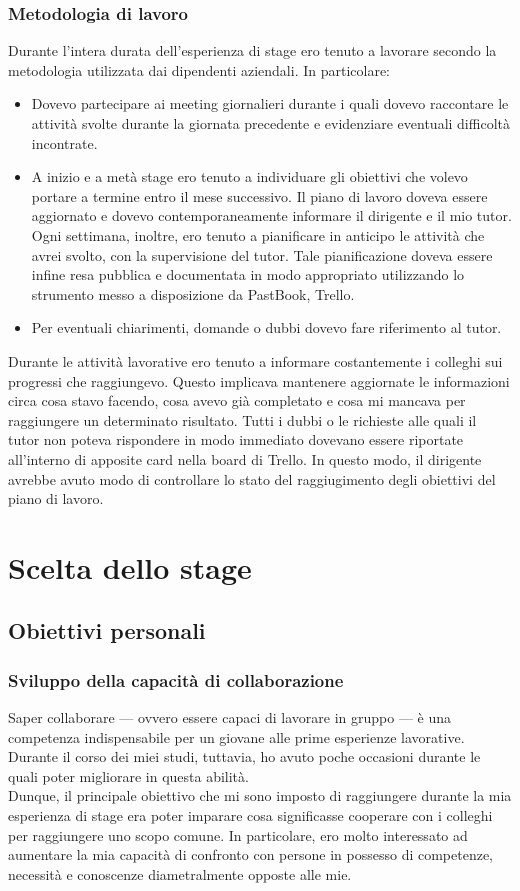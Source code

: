 		\subsubsection{Metodologia di lavoro}
			Durante l'intera durata dell'esperienza di stage ero tenuto a lavorare secondo la metodologia utilizzata dai dipendenti
			aziendali. In particolare:
			\begin{itemize}
				\item Dovevo partecipare ai meeting giornalieri durante i quali dovevo raccontare le attività svolte durante la
				giornata precedente e evidenziare eventuali difficoltà incontrate.
				\item A inizio e a metà stage ero tenuto a individuare gli obiettivi che volevo portare a termine entro il
				mese successivo. Il piano di lavoro doveva essere aggiornato e dovevo contemporaneamente informare il dirigente e il
				mio tutor. Ogni settimana, inoltre, ero tenuto a pianificare in anticipo le attività che avrei svolto, con la
				supervisione del tutor. Tale pianificazione doveva essere infine resa pubblica e documentata in modo appropriato
				utilizzando lo strumento messo a disposizione da PastBook, Trello.
				\item Per eventuali chiarimenti, domande o dubbi dovevo fare riferimento al tutor.
			\end{itemize}
			Durante le attività lavorative ero tenuto a informare costantemente i colleghi sui progressi che raggiungevo. Questo
			implicava mantenere aggiornate le informazioni circa cosa stavo facendo, cosa avevo già completato e cosa mi mancava
			per raggiungere un determinato risultato. Tutti i dubbi o le richieste alle quali il tutor non poteva rispondere in modo
			immediato dovevano essere riportate all'interno di apposite card nella board di Trello. In questo modo, il dirigente avrebbe
			avuto modo di controllare lo stato del raggiugimento degli obiettivi del piano di lavoro.
	\section{Scelta dello stage}
		\subsection{Obiettivi personali}
			\subsubsection{Sviluppo della capacità di collaborazione}
				Saper collaborare — ovvero essere capaci di lavorare in gruppo — è una competenza indispensabile per un giovane alle
				prime esperienze lavorative. Durante il corso dei miei studi, tuttavia, ho avuto poche occasioni durante le quali
				poter migliorare in questa abilità.\\
				Dunque, il principale obiettivo che mi sono imposto di raggiungere durante la mia esperienza di stage era
				poter imparare cosa significasse cooperare con i colleghi per raggiungere uno scopo comune. In particolare, ero molto
				interessato ad aumentare la mia capacità di confronto con persone in possesso di competenze, necessità e conoscenze
				diametralmente opposte alle mie.
